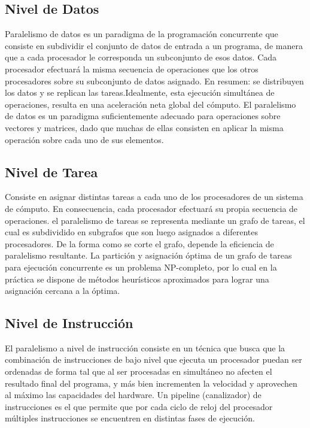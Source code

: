 \documentclass[11pt,letterpaper]{report}
\begin{document}
\subsection*{Nivel de Datos}
Paralelismo de datos es un paradigma de la programaci\' on concurrente que consiste en subdividir el conjunto de datos de entrada a un programa, de manera que a cada procesador le corresponda un subconjunto de esos datos.
Cada procesador efectuará la misma secuencia de operaciones que los otros procesadores sobre su subconjunto de datos asignado.
En resumen: se distribuyen los datos y se replican las tareas.Idealmente, esta ejecuci\' on simultánea de operaciones, resulta en una aceleraci\' on neta global del c\' omputo.
El paralelismo de datos es un paradigma suficientemente adecuado para operaciones sobre vectores y matrices, dado que muchas de ellas consisten en aplicar la misma operaci\' on sobre cada uno de sus elementos.
\subsection*{Nivel de Tarea}
Consiste en asignar distintas tareas a cada uno de los procesadores de un sistema de c\' omputo. En consecuencia, cada procesador efectuará su propia secuencia de operaciones.
 el paralelismo de tareas se representa mediante un grafo de tareas, el cual es subdividido en subgrafos que son luego asignados a diferentes procesadores. De la forma como se corte el grafo, depende la eficiencia de paralelismo resultante.
 La partici\' on y asignaci\' on \' optima de un grafo de tareas para ejecuci\' on concurrente es un problema NP-completo, por lo cual en la práctica se dispone de métodos heurísticos aproximados para lograr una asignaci\' on cercana a la \' optima.
\subsection*{Nivel de Instrucci\' on}
El paralelismo a nivel de instrucci\' on consiste en un técnica que busca que la combinaci\' on de instrucciones de bajo nivel que ejecuta un procesador puedan ser ordenadas de forma tal que al ser procesadas en simultáneo no afecten el resultado
final del programa, y más bien incrementen la velocidad y aprovechen al máximo las capacidades del hardware. Un pipeline (canalizador) de instrucciones es el que permite que por cada ciclo de reloj del procesador múltiples
instrucciones se encuentren en distintas fases de ejecuci\' on.
\end{document}
